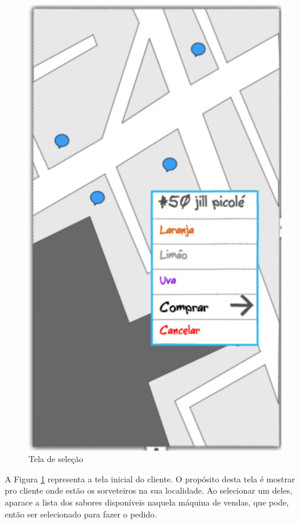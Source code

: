 \begin{figure}[!h]
	\centering
    \includegraphics[scale=0.7]{figuras/home_cliente}
    \caption{Tela de seleção}
    \label{fig:home_page}
\end{figure}

\newpage

A Figura \ref{fig:home_page} representa a tela inicial do cliente. O propósito desta tela é mostrar pro cliente onde estão os sorveteiros na sua localidade. Ao selecionar um deles, aparace a lista dos sabores disponíveis naquela máquina de vendas, que pode, então ser selecionado para fazer o pedido.

